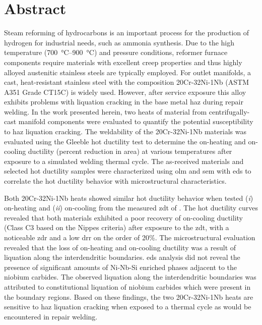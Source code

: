 \chapter*{Abstract}\label{ch:abstract}
Steam reforming of hydrocarbons is an important process for the production of hydrogen for industrial needs, such as ammonia synthesis. Due to the high temperature (\SIrange[range-phrase=--]{700}{900}{\degreeCelsius}) and pressure conditions, reformer furnace components require materials with excellent creep properties and thus highly alloyed austenitic stainless steels are typically employed. For outlet manifolds, a cast, heat-resistant stainless steel with the composition 20Cr-32Ni-1Nb (ASTM A351 Grade CT15C) is widely used. However, after service exposure this alloy exhibits problems with liquation cracking in the base metal \gls{haz} during repair welding. In the work presented herein, two heats of material from centrifugally-cast manifold components were evaluated to quantify the potential susceptibility to \gls{haz} liquation cracking. The weldability of the 20Cr-32Ni-1Nb materials was evaluated using the Gleeble\texttrademark{} hot ductility test to determine the on-heating and on-cooling ductility (percent reduction in area) at various temperatures after exposure to a simulated welding thermal cycle. The as-received materials and selected hot ductility samples were characterized using \gls{olm} and \gls{sem} with \gls{eds} to correlate the hot ductility behavior with microstructural characteristics.

Both 20Cr-32Ni-1Nb heats showed similar hot ductility behavior when tested (\emph{i}) on-heating and (\emph{ii}) on-cooling from the measured \gls{zdt} of . The hot ductility curves revealed that both materials exhibited a poor recovery of on-cooling ductility (Class C3 based on the Nippes criteria) after exposure to the \gls{zdt}, with a noticeable \gls{zdr} and a low \gls{drr} on the order of 20\%. The microstructural evaluation revealed that the loss of on-heating and on-cooling ductility was a result of liquation along the interdendritic boundaries. \gls{eds} analysis did not reveal the presence of significant amounts of Ni-Nb-Si enriched phases adjacent to the niobium carbides. The observed liquation along the interdendritic boundaries was attributed to constitutional liquation of niobium carbides which were present in the boundary regions. Based on these findings, the two 20Cr-32Ni-1Nb heats are sensitive to \gls{haz} liquation cracking when exposed to a thermal cycle as would be encountered in repair welding.





